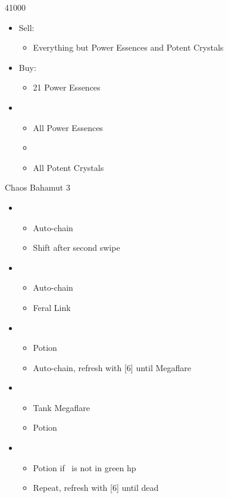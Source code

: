 \begin{shop}{41000}
\begin{itemize}
	\item Sell:
	\begin{itemize}
		\item Everything but Power Essences and Potent Crystals
	\end{itemize}
	\item Buy:
	\begin{itemize}
		\item 21 Power Essences
	\end{itemize}
\end{itemize}
\end{shop}
\begin{menu}
\begin{itemize}
	\crystarium
	\begin{itemize}
		\item \chu
		\begin{itemize}
			\item All Power Essences
			\item {}
			\item All Potent Crystals
		\end{itemize}
	\end{itemize}
\end{itemize}
\end{menu}

\begin{battle}{Chaos Bahamut 3}
\begin{flushleft}
\begin{itemize}
	\item \sixth
	\begin{itemize}
		\item Auto-chain
		\item Shift after second swipe
	\end{itemize}
	\item \second
	\begin{itemize}
		\item Auto-chain
		\item Feral Link
	\end{itemize}
	\item \sixth
	\begin{itemize}
		\item Potion
		\item Auto-chain, refresh with [6] until Megaflare
	\end{itemize}
	\item \fourth
	\begin{itemize}
		\item Tank Megaflare
		\item Potion
	\end{itemize}
	\item \fifth
	\begin{itemize}
		\item Potion if \chu\ is not in green hp
		\item Repeat, refresh with [6] until dead
	\end{itemize}
\end{itemize}
\end{flushleft}
\end{battle}

